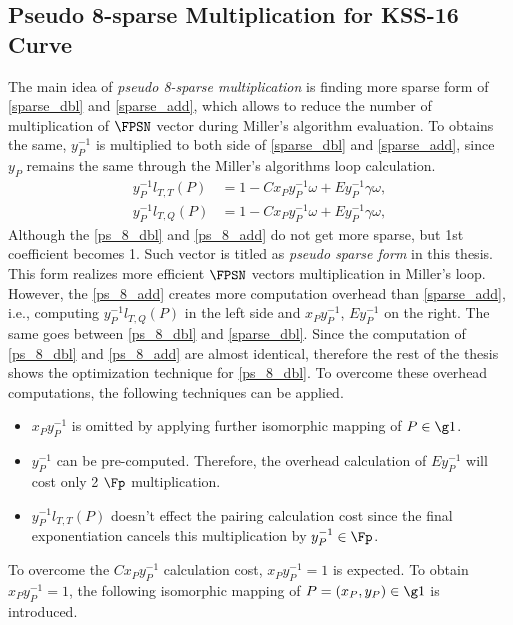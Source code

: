 \subsection{Pseudo 8-sparse Multiplication for KSS-16 Curve}
The main idea of  \textit{pseudo 8-sparse multiplication} is finding more sparse form  of \eqref{sparse_dbl} and \eqref{sparse_add}, which allows to reduce the number of multiplication of $\FPSN$ vector during Miller's algorithm evaluation.  To obtains the same, $y_P^{-1}$ is multiplied to both side of  \eqref{sparse_dbl} and \eqref{sparse_add}, since $y_P$  remains the same through the Miller's algorithms loop calculation.
\begin{subequations}
\begin{eqnarray}
y_{P}^{-1}l_{T,T}(P)& =  1 -Cx_{P}y_{P}^{-1}\omega+E y_{P}^{-1}\gamma \omega,  \label{ps_8_dbl}\\
y_{P}^{-1}l_{T,Q}(P)& =  1 -Cx_{P}y_{P}^{-1}\omega+E y_{P}^{-1}\gamma \omega, \label{ps_8_add}
\end{eqnarray}
\end{subequations}
Although the \eqref{ps_8_dbl} and \eqref{ps_8_add} do not get more sparse, but 1st coefficient becomes 1. 
Such vector is titled as \textit{pseudo sparse form} in this thesis. This form realizes more efficient $\FPSN$ vectors  multiplication in Miller's loop.  
However, the \eqref{ps_8_add} creates more computation overhead than \eqref{sparse_add}, i.e., computing $y_{P}^{-1}l_{T,Q}(P)$ in the left side and $x_Py_{P}^{-1}$, $Ey_P^{-1}$ on the right. 
The same goes between \eqref{ps_8_dbl} and \eqref{sparse_dbl}. 
Since the computation of \eqref{ps_8_dbl} and \eqref{ps_8_add} are almost identical, therefore the rest of the thesis shows the optimization technique for \eqref{ps_8_dbl}.
To overcome these overhead computations, the following techniques can be applied.
\begin{itemize}
\item $x_{P}y_{P}^{-1}$ is omitted by applying further isomorphic mapping of $P \in \g1$.
\item  $y_P^{-1} $ can be pre-computed. Therefore, the overhead calculation of $Ey_P^{-1}$ will cost only 2 $\Fp$ multiplication.
\item  $y_{P}^{-1}l_{T,T}(P)$  doesn't effect the pairing calculation cost since the final exponentiation cancels this multiplication by $y_{P}^{-1} \in \Fp$.
\end{itemize}

To overcome the $Cx_{P}y_{P}^{-1}$  calculation cost, $x_{P}y_{P}^{-1} =1 $ is expected. 
To obtain $x_{P}y_{P}^{-1} = 1$, the following isomorphic mapping of $P=(x_P,y_P) \in \g1$ is introduced. 


